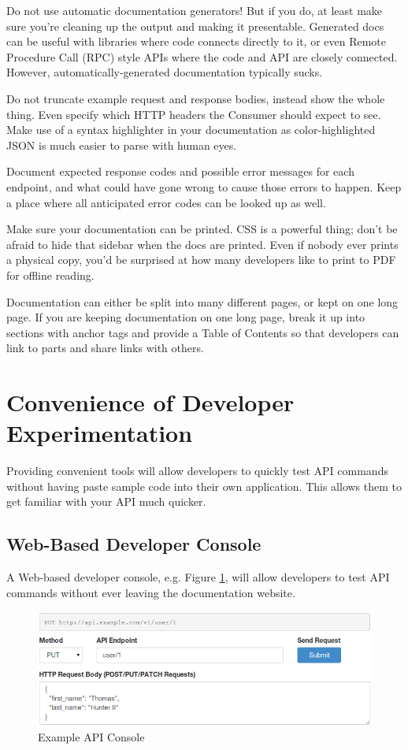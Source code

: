 \documentclass{book}
\begin{document}
Do not use automatic documentation generators! But if you do, at least make sure you're cleaning up the output and making it presentable. Generated docs can be useful with libraries where code connects directly to it, or even Remote Procedure Call (RPC) style APIs where the code and API are closely connected. However, automatically-generated documentation typically sucks.

Do not truncate example request and response bodies, instead show the whole thing. Even specify which HTTP headers the Consumer should expect to see. Make use of a syntax highlighter in your documentation as color-highlighted JSON is much easier to parse with human eyes.

Document expected response codes and possible error messages for each endpoint, and what could have gone wrong to cause those errors to happen. Keep a place where all anticipated error codes can be looked up as well.

Make sure your documentation can be printed. CSS is a powerful thing; don't be afraid to hide that sidebar when the docs are printed. Even if nobody ever prints a physical copy, you'd be surprised at how many developers like to print to PDF for offline reading.

Documentation can either be split into many different pages, or kept on one long page. If you are keeping documentation on one long page, break it up into sections with anchor tags and provide a Table of Contents so that developers can link to parts and share links with others.


\section{Convenience of Developer Experimentation}

Providing convenient tools will allow developers to quickly test API commands without having paste sample code into their own application. This allows them to get familiar with your API much quicker.

\subsection{Web-Based Developer Console}

A Web-based developer console, e.g. Figure \ref{fig:devconsole}, will allow developers to test API commands without ever leaving the documentation website.

\begin{figure}[ht!]
\centering
\includegraphics[width=140mm]{images/api-console.png}
\caption{Example API Console}
\label{fig:devconsole}
\end{figure}
\end{document}
